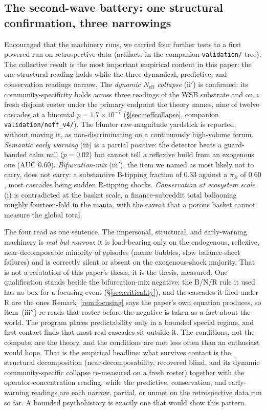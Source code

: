 \documentclass[11pt]{article}
\begin{document}
\subsection{The second-wave battery: one structural confirmation, three narrowings}
\label{sec:secondwave}

Encouraged that the machinery runs, we carried four further tests to a first powered run on retrospective data (artifacts in the companion \texttt{validation/} tree). The collective result is the most important empirical content in this paper: the one structural reading holds while the three dynamical, predictive, and conservation readings narrow. The \emph{dynamic $N_{\mathrm{eff}}$ collapse} (ii$'$) is confirmed: its community-specificity holds across three readings of the WSB substrate and on a fresh disjoint roster under the primary endpoint the theory names, nine of twelve cascades at a binomial $p=1.7\times10^{-7}$ (\S\ref{sec:neffcollapse}, companion \texttt{validation/neff\_v4/}). The blunter raw-magnitude yardstick is reported, without moving it, as non-discriminating on a continuously high-volume forum. \emph{Semantic early warning} (iii) is a partial positive: the detector beats a guard-banded calm null ($p=0.02$) but cannot tell a reflexive build from an exogenous one (AUC $0.60$). \emph{Bifurcation-mix} (iii$'$), the item we named as most likely not to carry, does not carry: a substantive B-tipping fraction of $0.33$ against a $\pi_B$ of $0.60$, most cascades being sudden R-tipping shocks. \emph{Conservation at ecosystem scale} (i) is contradicted at the basket scale, a finance-subreddit total ballooning roughly fourteen-fold in the mania, with the caveat that a porous basket cannot measure the global total.

The four read as one sentence. The impersonal, structural, and early-warning machinery is \emph{real but narrow}: it is load-bearing only on the endogenous, reflexive, near-decomposable minority of episodes (meme bubbles, slow balance-sheet failures) and is correctly silent or absent on the exogenous-shock majority. That is not a refutation of this paper's thesis; it is the thesis, measured. One qualification stands beside the bifurcation-mix negative: the B/N/R rule it used has no box for a focusing event (\S\ref{sec:criticality}), and the cascades it filed under R are the ones Remark~\ref{rem:focusing} says the paper's own equation produces, so item~(iii$''$) re-reads that roster before the negative is taken as a fact about the world. The program places predictability only in a bounded special regime, and first contact finds that most real cascades sit outside it. The conditions, not the compute, are the theory, and the conditions are met less often than an enthusiast would hope. That is the empirical headline: what survives contact is the structural decomposition (near-decomposability, recovered blind, and its dynamic community-specific collapse re-measured on a fresh roster) together with the operator-concentration reading, while the predictive, conservation, and early-warning readings are each narrow, partial, or unmet on the retrospective data run so far. A bounded psychohistory is exactly one that would show this pattern.
\end{document}

